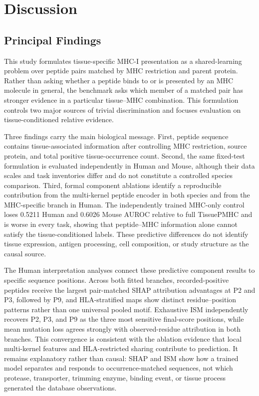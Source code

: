 \section{Discussion}

\subsection{Principal Findings}

This study formulates tissue-specific MHC-I presentation as a shared-learning problem over peptide pairs matched by MHC restriction and parent protein. Rather than asking whether a peptide binds to or is presented by an MHC molecule in general, the benchmark asks which member of a matched pair has stronger evidence in a particular tissue--MHC combination. This formulation controls two major sources of trivial discrimination and focuses evaluation on tissue-conditioned relative evidence.

Three findings carry the main biological message. First, peptide sequence contains tissue-associated information after controlling MHC restriction, source protein, and total positive tissue-occurrence count. Second, the same fixed-test formulation is evaluated independently in Human and Mouse, although their data scales and task inventories differ and do not constitute a controlled species comparison. Third, formal component ablations identify a reproducible contribution from the multi-kernel peptide encoder in both species and from the MHC-specific branch in Human. The independently trained MHC-only control loses 0.5211 Human and 0.6026 Mouse AUROC relative to full TissuePMHC and is worse in every task, showing that peptide--MHC information alone cannot satisfy the tissue-conditioned labels. These predictive differences do not identify tissue expression, antigen processing, cell composition, or study structure as the causal source.

The Human interpretation analyses connect these predictive component results to specific sequence positions. Across both fitted branches, recorded-positive peptides receive the largest pair-matched SHAP attribution advantages at P2 and P3, followed by P9, and HLA-stratified maps show distinct residue--position patterns rather than one universal pooled motif. Exhaustive ISM independently recovers P2, P3, and P9 as the three most sensitive final-score positions, while mean mutation loss agrees strongly with observed-residue attribution in both branches. This convergence is consistent with the ablation evidence that local multi-kernel features and HLA-restricted sharing contribute to prediction. It remains explanatory rather than causal: SHAP and ISM show how a trained model separates and responds to occurrence-matched sequences, not which protease, transporter, trimming enzyme, binding event, or tissue process generated the database observations.

